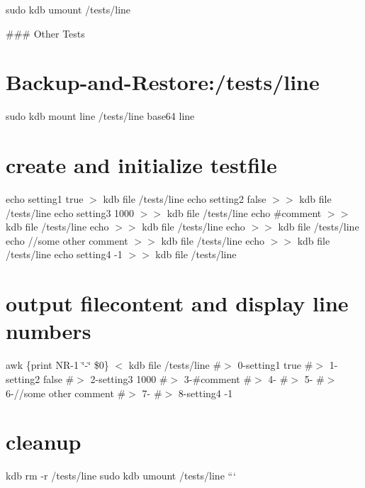 sudo kdb umount /tests/line 
\begin{DoxyCode}
### Other Tests
\end{DoxyCode}
 \hypertarget{autotoc_md341_autotoc_md347}{}\section{Backup-\/and-\/\+Restore\+:/tests/line}\label{autotoc_md341_autotoc_md347}
sudo kdb mount line /tests/line base64 line\hypertarget{autotoc_md341_autotoc_md348}{}\section{create and initialize testfile}\label{autotoc_md341_autotoc_md348}
echo \textquotesingle{}setting1 true\textquotesingle{} $>$ {\ttfamily kdb file /tests/line} echo \textquotesingle{}setting2 false\textquotesingle{} $>$$>$ {\ttfamily kdb file /tests/line} echo \textquotesingle{}setting3 1000\textquotesingle{} $>$$>$ {\ttfamily kdb file /tests/line} echo \textquotesingle{}\#comment\textquotesingle{} $>$$>$ {\ttfamily kdb file /tests/line} echo $>$$>$ {\ttfamily kdb file /tests/line} echo $>$$>$ {\ttfamily kdb file /tests/line} echo \textquotesingle{}//some other comment\textquotesingle{} $>$$>$ {\ttfamily kdb file /tests/line} echo $>$$>$ {\ttfamily kdb file /tests/line} echo \textquotesingle{}setting4 -\/1\textquotesingle{} $>$$>$ {\ttfamily kdb file /tests/line}\hypertarget{autotoc_md341_autotoc_md349}{}\section{output filecontent and display line numbers}\label{autotoc_md341_autotoc_md349}
awk \textquotesingle{}\{print N\+R-\/1 \char`\"{}-\/\char`\"{} \$0\}\textquotesingle{} $<$ {\ttfamily kdb file /tests/line} \#$>$ 0-\/setting1 true \#$>$ 1-\/setting2 false \#$>$ 2-\/setting3 1000 \#$>$ 3-\/\#comment \#$>$ 4-\/ \#$>$ 5-\/ \#$>$ 6-\///some other comment \#$>$ 7-\/ \#$>$ 8-\/setting4 -\/1\hypertarget{autotoc_md341_autotoc_md350}{}\section{cleanup}\label{autotoc_md341_autotoc_md350}
kdb rm -\/r /tests/line sudo kdb umount /tests/line ``` 